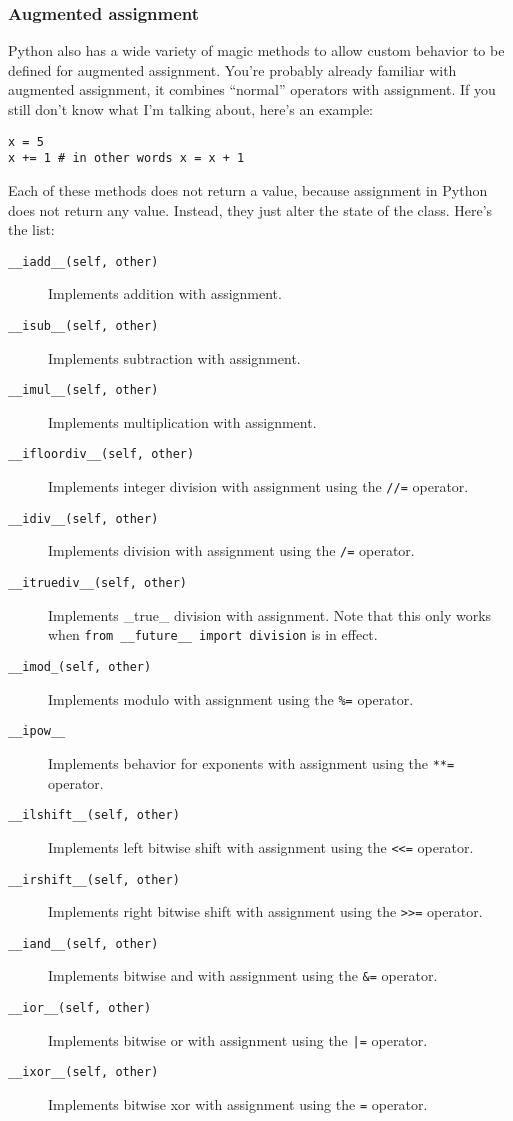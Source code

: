 \documentclass[a4paper,11pt]{article}
\newcommand{\code}[1]{\texttt{#1}}
\begin{document}
\subsubsection{Augmented assignment}

Python also has a wide variety of magic methods to allow custom behavior to be defined for augmented assignment. You're probably already familiar with augmented assignment, it combines ``normal'' operators with assignment. If you still don't know what I'm talking about, here's an example:

\begin{lstlisting}
x = 5
x += 1 # in other words x = x + 1
\end{lstlisting}

Each of these methods does not return a value, because assignment in Python does not return any value. Instead, they just alter the state of the class. Here's the list:

\begin{description}

\item[\code{__iadd__(self, other)}]
Implements addition with assignment.
\item[\code{__isub__(self, other)}]
Implements subtraction with assignment.
\item[\code{__imul__(self, other)}]
Implements multiplication with assignment.
\item[\code{__ifloordiv__(self, other)}]
Implements integer division with assignment using the \code{//=} operator.
\item[\code{__idiv__(self, other)}]
Implements division with assignment using the \code{/=} operator.
\item[\code{__itruediv__(self, other)}]
Implements _true_ division with assignment. Note that this only works when \code{from __future__ import division} is in effect.
\item[\code{__imod_(self, other)}]
Implements modulo with assignment using the \code{\%=} operator.
\item[\code{__ipow__}]
Implements behavior for exponents with assignment using the \code{**=} operator.
\item[\code{__ilshift__(self, other)}]
Implements left bitwise shift with assignment using the \code{<<=} operator.
\item[\code{__irshift__(self, other)}]
Implements right bitwise shift with assignment using the \code{>>=} operator.
\item[\code{__iand__(self, other)}]
Implements bitwise and with assignment using the \code{\&=} operator.
\item[\code{__ior__(self, other)}]
Implements bitwise or with assignment using the \code{|=} operator.
\item[\code{__ixor__(self, other)}]
Implements bitwise xor with assignment using the \code{=} operator.

\end{description}
\end{document}
